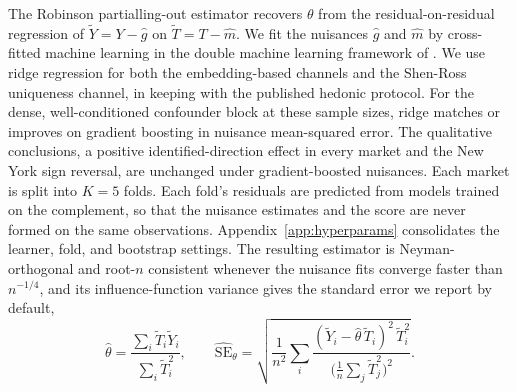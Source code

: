 The
Robinson partialling-out estimator \citep{robinson1988root} recovers $\theta$ from
the residual-on-residual regression of $\tilde{Y} = Y - \hat{g}$ on
$\tilde{T} = T - \hat{m}$. We fit the nuisances $\hat{g}$ and $\hat{m}$ by
cross-fitted machine learning in the double machine learning framework of
\citet{chernozhukov2018double}. We use ridge regression for both the
embedding-based channels and the Shen-Ross uniqueness channel, in keeping with the
published hedonic protocol. For the dense, well-conditioned confounder block at
these sample sizes, ridge matches or improves on gradient boosting in nuisance
mean-squared error. The qualitative conclusions, a positive identified-direction
effect in every market and the New York sign reversal, are unchanged under
gradient-boosted nuisances. Each market is split into $K = 5$ folds. Each
fold's residuals are predicted from models trained on the complement, so that the
nuisance estimates and the score are never formed on the same observations.
Appendix~\ref{app:hyperparams} consolidates the learner, fold, and bootstrap
settings. The resulting estimator is Neyman-orthogonal and root-$n$ consistent whenever the
nuisance fits converge faster than $n^{-1/4}$, and its influence-function variance
gives the standard error we report by default,
\begin{equation}
\hat{\theta} = \frac{\sum_i \tilde{T}_i \tilde{Y}_i}{\sum_i \tilde{T}_i^{2}},
\qquad
\hat{\mathrm{SE}}_\theta
= \sqrt{\frac{1}{n^{2}} \sum_i
\frac{(\tilde{Y}_i - \hat{\theta}\,\tilde{T}_i)^{2}\,\tilde{T}_i^{2}}
{\big(\tfrac{1}{n}\sum_j \tilde{T}_j^{2}\big)^{2}}}.
\label{eq:dml}
\end{equation}

